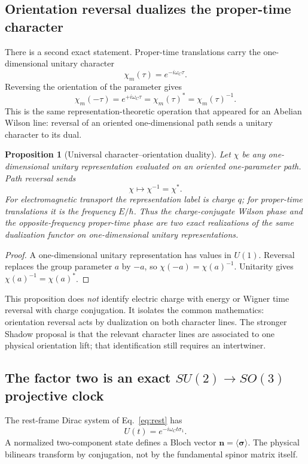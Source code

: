 \documentclass[11pt]{article}
\newtheorem{proposition}[theorem]{Proposition}
\theoremstyle{definition}\newtheorem{definition}[theorem]{Definition}
\theoremstyle{remark}\newtheorem{remark}[theorem]{Remark}\newtheorem{conjecture}[theorem]{Conjecture}
\begin{document}
\subsection{Orientation reversal dualizes the proper-time character}
There is a second exact statement. Proper-time translations carry the one-dimensional unitary character
\begin{equation}\label{eq:timecharacter}
 \chi_m(\tau)=e^{-i\omega_C\tau}.
\end{equation}
Reversing the orientation of the parameter gives
\begin{equation}\label{eq:timecharacterdual}
 \chi_m(-\tau)=e^{+i\omega_C\tau}=\chi_m(\tau)^*=\chi_m(\tau)^{-1}.
\end{equation}
This is the same representation-theoretic operation that appeared for an Abelian Wilson line: reversal of an oriented one-dimensional path sends a unitary character to its dual.

\begin{proposition}[Universal character--orientation duality]\label{prop:characterduality}
Let $\chi$ be any one-dimensional unitary representation evaluated on an oriented one-parameter path. Path reversal sends
\begin{equation}
 \chi\longmapsto\chi^{-1}=\chi^*.
\end{equation}
For electromagnetic transport the representation label is charge $q$; for proper-time translations it is the frequency $E/\hbar$. Thus the charge-conjugate Wilson phase and the opposite-frequency proper-time phase are two exact realizations of the same dualization functor on one-dimensional unitary representations.
\end{proposition}
\begin{proof}
A one-dimensional unitary representation has values in $U(1)$. Reversal replaces the group parameter $a$ by $-a$, so $\chi(-a)=\chi(a)^{-1}$. Unitarity gives $\chi(a)^{-1}=\chi(a)^*$.
\end{proof}

This proposition does \emph{not} identify electric charge with energy or Wigner time reversal with charge conjugation. It isolates the common mathematics: orientation reversal acts by dualization on both character lines. The stronger Shadow proposal is that the relevant character lines are associated to one physical orientation lift; that identification still requires an intertwiner.

\subsection{The factor two is an exact \texorpdfstring{$SU(2)\to SO(3)$}{SU(2) to SO(3)} projective clock}
The rest-frame Dirac system of Eq.~\eqref{eq:rest} has
\begin{equation}
 U(t)=e^{-i\omega_Ct\sigma_1}.
\end{equation}
A normalized two-component state defines a Bloch vector $\bm n=\langle\bm\sigma\rangle$. The physical bilinears transform by conjugation, not by the fundamental spinor matrix itself.
\end{document}
